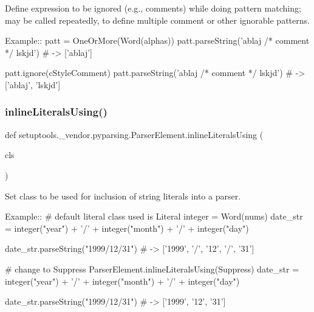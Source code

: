 \begin{DoxyVerb}Define expression to be ignored (e.g., comments) while doing pattern
matching; may be called repeatedly, to define multiple comment or other
ignorable patterns.

Example::
    patt = OneOrMore(Word(alphas))
    patt.parseString('ablaj /* comment */ lskjd') # -> ['ablaj']
    
    patt.ignore(cStyleComment)
    patt.parseString('ablaj /* comment */ lskjd') # -> ['ablaj', 'lskjd']
\end{DoxyVerb}
 \mbox{\label{classsetuptools_1_1__vendor_1_1pyparsing_1_1_parser_element_ab48c9762534971e65dbb220d20c37990}} 
\subsubsection{\texorpdfstring{inline\+Literals\+Using()}{inlineLiteralsUsing()}}
{\footnotesize\ttfamily def setuptools.\+\_\+vendor.\+pyparsing.\+Parser\+Element.\+inline\+Literals\+Using (\begin{DoxyParamCaption}\item[{}]{cls }\end{DoxyParamCaption})\hspace{0.3cm}{\ttfamily [static]}}

\begin{DoxyVerb}Set class to be used for inclusion of string literals into a parser.

Example::
    # default literal class used is Literal
    integer = Word(nums)
    date_str = integer("year") + '/' + integer("month") + '/' + integer("day")           

    date_str.parseString("1999/12/31")  # -> ['1999', '/', '12', '/', '31']


    # change to Suppress
    ParserElement.inlineLiteralsUsing(Suppress)
    date_str = integer("year") + '/' + integer("month") + '/' + integer("day")           

    date_str.parseString("1999/12/31")  # -> ['1999', '12', '31']
\end{DoxyVerb}
 \mbox{\label{classsetuptools_1_1__vendor_1_1pyparsing_1_1_parser_element_a1d04ca7a8f3273cf1e2ec1668c456145}} 
